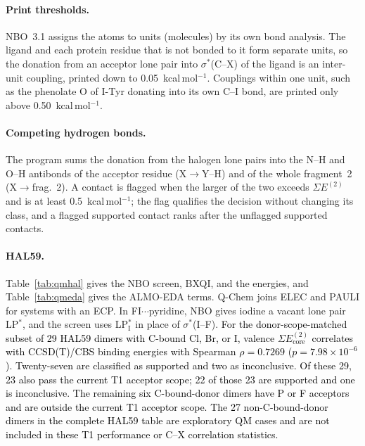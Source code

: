 \documentclass[journal=jcisd8,manuscript=suppinfo]{achemso}
\newcommand{\tcb}[1]{{\textcolor{black}{#1}}}
\newcommand{\ET}{E^{(2)}}
\begin{document}
\begin{singlespace}
\paragraph{Print thresholds.} NBO~3.1 assigns the atoms to units (molecules) by its own bond analysis. The ligand and each protein residue that is not bonded to it form separate units, so the donation from an acceptor lone pair into $\sigma^*$(C--X) of the ligand is an inter-unit coupling, printed down to 0.05~kcal\,mol$^{-1}$. Couplings within one unit, such as the phenolate O of I-Tyr donating into its own C--I bond, are printed only above 0.50~kcal\,mol$^{-1}$.

\paragraph{Competing hydrogen bonds.} The program sums the donation from the halogen lone pairs into the N--H and O--H antibonds of the acceptor residue (X$\to$Y--H) and of the whole fragment~2 (X$\to$frag.~2). A contact is flagged when the larger of the two exceeds $\Sigma\ET$ and is at least 0.5~kcal\,mol$^{-1}$; the flag qualifies the decision without changing its class, and a flagged supported contact ranks after the unflagged supported contacts.

\paragraph{HAL59.} Table~\ref{tab:qmhal} gives the NBO screen, BXQI, and the energies, and Table~\ref{tab:qmeda} gives the ALMO-EDA terms. Q-Chem joins ELEC and PAULI for systems with an ECP. In FI$\cdots$pyridine, NBO gives iodine a vacant lone pair LP$^*$, and the screen uses LP$^*_\mathrm{I}$ in place of $\sigma^*$(I--F). \tcb{For the donor-scope-matched subset of 29 HAL59 dimers with C-bound Cl, Br, or I, valence $\Sigma E^{(2)}_{\mathrm{core}}$ correlates with CCSD(T)/CBS binding energies with Spearman $\rho=0.7269$ ($p=7.98\times10^{-6}$). Twenty-seven are classified as supported and two as inconclusive. Of these 29, 23 also pass the current T1 acceptor scope; 22 of those 23 are supported and one is inconclusive. The remaining six C-bound-donor dimers have P or F acceptors and are outside the current T1 acceptor scope. The 27 non-C-bound-donor dimers in the complete HAL59 table are exploratory QM cases and are not included in these T1 performance or C--X correlation statistics.}


\end{singlespace}
\end{document}
